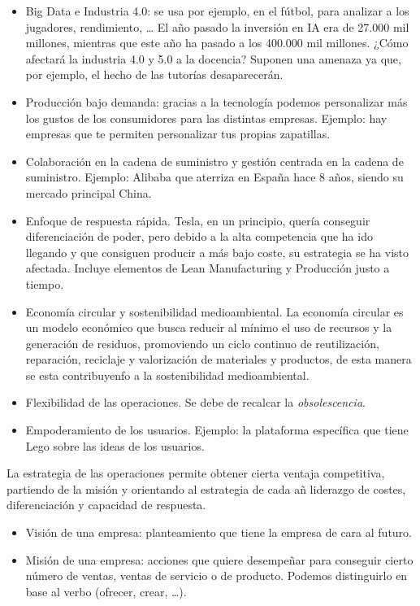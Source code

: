 \documentclass[12pt]{book} %
\providecommand{\tightlist}{%
  \setlength{\itemsep}{0pt}\setlength{\parskip}{0pt}}
\begin{document}
\begin{itemize}
\tightlist
\item
  Big Data e Industria 4.0: se usa por ejemplo, en el fútbol, para
  analizar a los jugadores, rendimiento, \ldots{} El año pasado la
  inversión en IA era de 27.000 mil millones, mientras que este año ha
  pasado a los 400.000 mil millones. ¿Cómo afectará la industria 4.0 y
  5.0 a la docencia? Suponen una amenaza ya que, por ejemplo, el hecho
  de las tutorías desaparecerán.
\item
  Producción bajo demanda: gracias a la tecnología podemos personalizar
  más los gustos de los consumidores para las distintas empresas.
  Ejemplo: hay empresas que te permiten personalizar tus propias
  zapatillas.
\item
  Colaboración en la cadena de suministro y gestión centrada en la
  cadena de suministro. Ejemplo: Alibaba que aterriza en España hace 8
  años, siendo su mercado principal China.
\item
  Enfoque de respuesta rápida. Tesla, en un principio, quería conseguir
  diferenciación de poder, pero debido a la alta competencia que ha ido
  llegando y que consiguen producir a más bajo coste, su estrategia se
  ha visto afectada. Incluye elementos de Lean Manufacturing y
  Producción justo a tiempo.
\item
  Economía circular y sostenibilidad medioambiental. La economía
  circular es un modelo económico que busca reducir al mínimo el uso de
  recursos y la generación de residuos, promoviendo un ciclo continuo de
  reutilización, reparación, reciclaje y valorización de materiales y
  productos, de esta manera se esta contribuyenfo a la sostenibilidad
  medioambiental.
\item
  Flexibilidad de las operaciones. Se debe de recalcar la
  \emph{obsolescencia}.
\item
  Empoderamiento de los usuarios. Ejemplo: la plataforma específica que
  tiene Lego sobre las ideas de los usuarios.
\end{itemize}

La estrategia de las operaciones permite obtener cierta ventaja
competitiva, partiendo de la misión y orientando al estrategia de cada
añ liderazgo de costes, diferenciación y capacidad de respuesta.

\begin{itemize}
\tightlist
\item
  Visión de una empresa: planteamiento que tiene la empresa de cara al
  futuro.
\item
  Misión de una empresa: acciones que quiere desempeñar para conseguir
  cierto número de ventas, ventas de servicio o de producto. Podemos
  distinguirlo en base al verbo (ofrecer, crear, \ldots).
\end{itemize}
\end{document}
